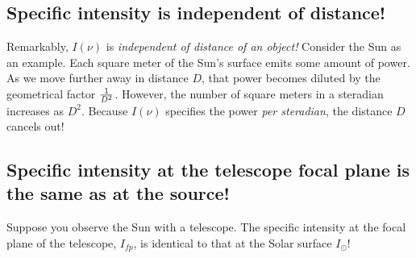 \documentclass[psfig,preprint]{aastex}
\begin{document}
\subsection {Specific intensity is independent of distance!}

	Remarkably, $I(\nu)$ is {\it independent of distance of an
object!} Consider the Sun as an example.  Each square meter of the Sun's
surface emits some amount of power.  As we move further away in distance
$D$, that power becomes diluted by the geometrical factor $1 \over D^2$. 
However, the number of square meters in a steradian increases as $D^2$. 
Because $I(\nu)$ specifies the power {\it per steradian}, the distance
$D$ cancels out!

\subsection{ Specific intensity at the telescope focal plane is the
same as at the source!}

	Suppose you observe the Sun with a telescope. The specific
intensity at the focal plane of the telescope, $I_{fp}$, is identical to
that at the Solar surface $I_\odot$! 
\end{document}
